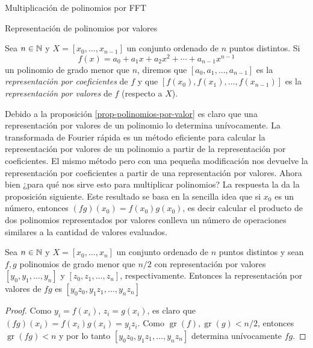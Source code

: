 \begin{chapter}{Multiplicación de polinomios por FFT}
\begin{section}{Representación de polinomios por valores}
        \begin{definicion}\label{def-representacion-por-valores-polinomio} Sea $n \in \mathbb N$ y $X = [x_0,\ldots,x_{n-1}]$  un conjunto ordenado de $n$ puntos distintos. Si 
            $$
            f(x) = a_0 + a_1 x+ a_2 x^2 + \cdots  + a_{n-1}x^{n-1}
            $$
        un polinomio de grado menor que $n$, diremos que $[a_0,a_1,\ldots, a_{n-1}]$  es la \textit{representación por coeficientes} de $f$ y que $[f(x_0),f(x_1),\ldots,f(x_{n-1})]$ es la \textit{representación por valores} de $f$ (respecto a $X$).
        \end{definicion}

        Debido a la proposición \ref{prop-polinomios-por-valor} es claro que una representación por valores de un polinomio lo determina unívocamente. La transformada de Fourier rápida es un método eficiente para calcular la representación por valores de un polinomio a partir de la representación por coeficientes. El mismo método pero con una pequeña modificación nos devuelve la representación por coeficientes a partir  de una representación por valores. Ahora bien ¿para qué nos sirve  esto para multiplicar polinomios? La respuesta la da la proposición siguiente. Este resultado se basa en la sencilla idea que si $x_0$ es un número,  entonces $(fg)(x_0) = f(x_0)g(x_0)$, es decir calcular el producto de dos polinomios representados por valores conlleva un número de operaciones similares a la cantidad de valores evaluados. 
        
        \begin{proposicion} \label{prop-mult-por-valor} Sea $n \in \mathbb N$ y $X = [x_0,\ldots,x_{n}]$  un conjunto ordenado de $n$ puntos distintos y sean $f,g$ polinomios de grado menor que  $n/2$ con representación  por valores $[y_0,y_1,\ldots,y_{n}]$ y $[z_0,z_1,\ldots,z_{n}]$, respectivamente. Entonces la representación por valores de $fg$ es $[y_0z_0,y_1z_1,\ldots,y_{n}z_{n}]$  
        \end{proposicion}
        \begin{proof}
            Como $y_i = f(x_i)$, $z_i = g(x_i)$,  es claro  que $(fg)(x_i) = f(x_i)g(x_i) = y_iz_i$. Como $\operatorname{gr}(f), \operatorname{gr}(g) < n/2$,  entonces $\operatorname{gr}(fg) < n$ y  por lo tanto $[y_0z_0,y_1z_1,\ldots,y_{n}z_{n}]$ determina unívocamente $fg$. 
        \end{proof}


\end{section}
\end{chapter}
